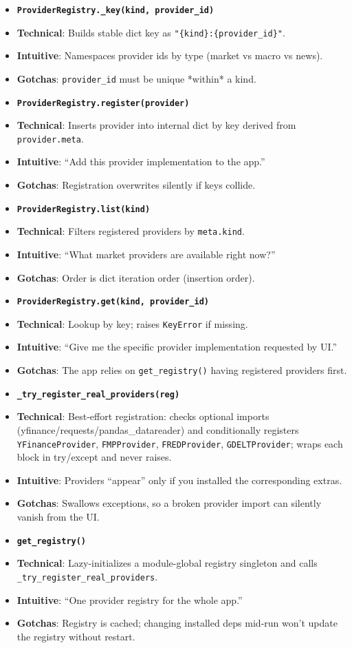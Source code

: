\documentclass[11pt]{article}
\begin{document}
\begin{itemize}[leftmargin=*,nosep]
\item \textbf{\texttt{ProviderRegistry.\_key(kind, provider\_id)}}
\item \textbf{Technical}: Builds stable dict key as \texttt{"\{kind\}:\{provider\_id\}"}.
\item \textbf{Intuitive}: Namespaces provider ids by type (market vs macro vs news).
\item \textbf{Gotchas}: \texttt{provider\_id} must be unique *within* a kind.
\item \textbf{\texttt{ProviderRegistry.register(provider)}}
\item \textbf{Technical}: Inserts provider into internal dict by key derived from \texttt{provider.meta}.
\item \textbf{Intuitive}: “Add this provider implementation to the app.”
\item \textbf{Gotchas}: Registration overwrites silently if keys collide.
\item \textbf{\texttt{ProviderRegistry.list(kind)}}
\item \textbf{Technical}: Filters registered providers by \texttt{meta.kind}.
\item \textbf{Intuitive}: “What market providers are available right now?”
\item \textbf{Gotchas}: Order is dict iteration order (insertion order).
\item \textbf{\texttt{ProviderRegistry.get(kind, provider\_id)}}
\item \textbf{Technical}: Lookup by key; raises \texttt{KeyError} if missing.
\item \textbf{Intuitive}: “Give me the specific provider implementation requested by UI.”
\item \textbf{Gotchas}: The app relies on \texttt{get\_registry()} having registered providers first.
\item \textbf{\texttt{\_try\_register\_real\_providers(reg)}}
\item \textbf{Technical}: Best-effort registration: checks optional imports (yfinance/requests/pandas\_datareader) and conditionally registers \texttt{YFinanceProvider}, \texttt{FMPProvider}, \texttt{FREDProvider}, \texttt{GDELTProvider}; wraps each block in try/except and never raises.
\item \textbf{Intuitive}: Providers “appear” only if you installed the corresponding extras.
\item \textbf{Gotchas}: Swallows exceptions, so a broken provider import can silently vanish from the UI.
\item \textbf{\texttt{get\_registry()}}
\item \textbf{Technical}: Lazy-initializes a module-global registry singleton and calls \texttt{\_try\_register\_real\_providers}.
\item \textbf{Intuitive}: “One provider registry for the whole app.”
\item \textbf{Gotchas}: Registry is cached; changing installed deps mid-run won’t update the registry without restart.
\end{itemize}
\end{document}
